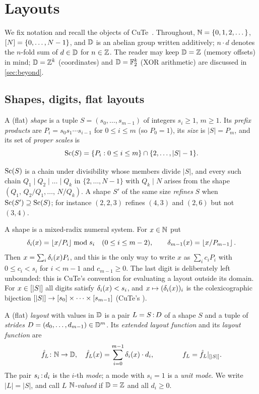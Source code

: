 \section{Layouts}\label{sec:background}

We fix notation and recall the objects of CuTe~\cite{cutedocs,cecka2026}. Throughout,
$\mathbb{N}=\{0,1,2,\dots\}$, $[N]=\{0,\dots,N-1\}$, and $\mathbb{D}$ is an abelian group written
additively; $n\cdot d$ denotes the $n$-fold sum of $d\in\mathbb{D}$ for $n\in\mathbb{Z}$. The reader may keep
$\mathbb{D}=\mathbb{Z}$ (memory offsets) in mind; $\mathbb{D}=\mathbb{Z}^k$ (coordinates) and $\mathbb{D}=\mathbb{F}_2^k$ (XOR arithmetic) are
discussed in \cref{sec:beyond}.

\subsection{Shapes, digits, flat layouts}

\begin{definition}\label{def:shape}
A (flat) \emph{shape} is a tuple $S=(s_0,\dots,s_{m-1})$ of integers $s_i\ge 1$, $m\ge 1$. Its
\emph{prefix products} are $P_i=s_0s_1\cdots s_{i-1}$ for $0\le i\le m$ (so $P_0=1$), its
\emph{size} is $|S|=P_m$, and its set of \emph{proper scales} is
\[ \operatorname{Sc}(S)=\{P_i : 0\le i\le m\}\cap\{2,\dots,|S|-1\}. \]
\end{definition}
\noindent
$\operatorname{Sc}(S)$ is a chain under divisibility whose members divide $|S|$, and every such chain
$Q_1\mid Q_2\mid\dots\mid Q_k$ in $\{2,\dots,N-1\}$ with $Q_k \mid N$ arises from the shape
$(Q_1,\,Q_2/Q_1,\dots,\,N/Q_k)$. A shape $S'$ of the same size \emph{refines} $S$ when
$\operatorname{Sc}(S')\supseteq\operatorname{Sc}(S)$; for instance $(2,2,3)$ refines $(4,3)$ and $(2,6)$ but not $(3,4)$.

A shape is a mixed-radix numeral system. For $x\in\mathbb{N}$ put
\[ \delta_i(x)=\left\lfloor x/P_i \right\rfloor\bmod s_i \quad (0\le i\le m-2), \qquad \delta_{m-1}(x)=\left\lfloor x/P_{m-1} \right\rfloor . \]
Then $x=\sum_i\delta_i(x)P_i$, and this is the only way to write $x$ as $\sum_i c_iP_i$ with
$0\le c_i<s_i$ for $i<m-1$ and $c_{m-1}\ge 0$. The last digit is deliberately left unbounded:
this is CuTe's convention for evaluating a layout outside its domain. For $x\in[|S|]$ all
digits satisfy $\delta_i(x)<s_i$, and $x\mapsto(\delta_i(x))_i$ is the colexicographic bijection
$[|S|]\to[s_0]\times\dots\times[s_{m-1}]$ (CuTe's ).

\begin{definition}[layout]\label{def:layout}
A (flat) \emph{layout} with values in $\mathbb{D}$ is a pair $L=S\,{:}\,D$ of a shape $S$ and a tuple of
\emph{strides} $D=(d_0,\dots,d_{m-1})\in\mathbb{D}^m$. Its \emph{extended layout function} and its
\emph{layout function} are
\[ \hat{f}_{L}\colon\mathbb{N}\to\mathbb{D},\quad \hat{f}_{L}(x)=\sum_{i=0}^{m-1}\delta_i(x)\cdot d_i, \qquad\qquad f_{L}=\hat{f}_{L}|_{[|S|]} . \]
The pair $s_i\,{:}\,d_i$ is the $i$-th \emph{mode}; a mode with $s_i=1$ is a \emph{unit mode}. We
write $|L|=|S|$, and call $L$ \emph{$\mathbb{N}$-valued} if $\mathbb{D}=\mathbb{Z}$ and all $d_i\ge 0$.
\end{definition}

